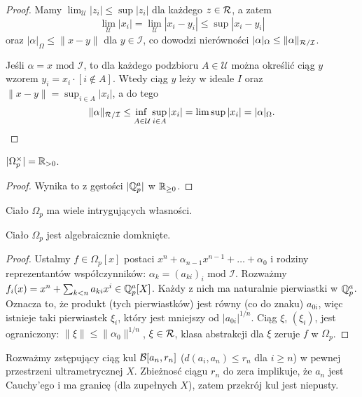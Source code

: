 \begin{proof}
	Mamy $\lim_{\mathcal U}|z_i| \le \sup |z_i|$ dla każdego $z \in \mathcal R$, a zatem
	\[
		\lim_{\mathcal U} |x_i| = \lim_{\mathcal U}|x_i - y_i| \le \sup |x_i - y_i|
	\] oraz $|\alpha|_\Omega  \le \|x - y\|$ dla $y \in \mathcal I$, co dowodzi nierówności $|\alpha|_\Omega \le \|\alpha\|_{\mathcal R / \mathcal I}$.

	Jeśli $\alpha = x \mbox { mod } \mathcal I$, to dla każdego podzbioru $A \in \mathcal U$ można określić ciąg $y$ wzorem $y_i = x_i \cdot [i \not \in A]$.
	Wtedy ciąg $y$ leży w ideale $I$ oraz $\|x - y\| = \sup_{i \in A} |x_i|$, a do tego
	\[
		\|\alpha\|_{\pierscien  / \mathcal I}  \le {\adjustlimits\inf_{A \in \mathcal U} \sup_{i \in A} |x_i|}
		 = \limsup |x_i| = |\alpha|_\Omega. \qedhere
	\]	
\end{proof}

\begin{fakt}
	$|\Omega_p^\times| = \mathbb R_{> 0}$.
\end{fakt}

\begin{proof}
	Wynika to z gęstości $|\mathbb Q_p^a|$ w $\mathbb R_{\ge 0}$.
\end{proof}

Ciało $\Omega_p$ ma wiele intrygujących własności.

\begin{fakt}
	Ciało $\Omega_p$ jest algebraicznie domknięte.
\end{fakt}

\begin{proof}
	Ustalmy $f \in \Omega_p[x]$ postaci $x^n + \alpha_{n-1} x^{n-1} + \ldots + \alpha_0$ i rodziny reprezentantów współczynników: $\alpha_k = (a_{ki})_i \mbox{ mod } \mathcal I$.
	Rozważmy $f_i(x) = x^n + \sum_{k < n} a_{ki} x^i \in \mathbb Q_p^a[X]$.
	Każdy z nich ma naturalnie pierwiastki w $\mathbb Q_p^a$.
	Oznacza to, że produkt (tych pierwiastków) jest równy (co do znaku) $a_{0i}$, więc istnieje taki pierwiastek $\xi_i$, który jest mniejszy od $|a_{0i}|^{1/n}$.
	Ciąg $\xi$, $(\xi_i)$, jest ograniczony: $\|\xi\| \le \|\alpha_0\|^{1/n}$, $\xi \in \mathcal R$, klasa abstrakcji dla $\xi$ zeruje $f$ w $\Omega_p$.
\end{proof}

Rozważmy zstępujący ciąg kul $\mathcal B[a_n, r_n]$ ($d(a_i, a_n) \le r_n$ dla $i \ge n$) w pewnej przestrzeni ultrametrycznej $X$.
Zbieżnosć ciągu $r_n$ do zera implikuje, że $a_n$ jest Cauchy'ego i ma granicę (dla zupełnych $X$), zatem przekrój kul jest niepusty.


